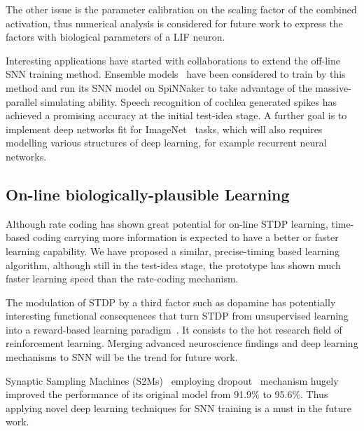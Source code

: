 The other issue is the parameter calibration on the scaling factor of the combined activation, thus numerical analysis is considered for future work to express the factors with biological parameters of a LIF neuron.

Interesting applications have started with collaborations to extend the off-line SNN training method.
Ensemble models~\cite{rokach2010ensemble} have been considered to train by this method and run its SNN model on SpiNNaker to take advantage of the massive-parallel simulating ability.
Speech recognition of cochlea generated spikes has achieved a promising accuracy at the initial test-idea stage.
A further goal is to implement deep networks fit for ImageNet~\cite{deng2009imagenet} tasks, which will also requires modelling various structures of deep learning, for example recurrent neural networks.


\subsection{On-line biologically-plausible Learning}
Although rate coding has shown great potential for on-line STDP learning, time-based coding carrying more information is expected to have a better or faster learning capability.
We have proposed a similar, precise-timing based learning algorithm, although still in the test-idea stage, the prototype has shown much faster learning speed than the rate-coding mechanism.

The modulation of STDP by a third factor such as dopamine has potentially interesting functional consequences that turn STDP from unsupervised learning into a reward-based learning paradigm~\cite{izhikevich2007solving}.
It consists to the hot research field of reinforcement learning.
Merging advanced neuroscience findings and deep learning mechanisms to SNN will be the trend for future work.


Synaptic Sampling Machines (S2Ms)~\cite{neftci2016stochastic} employing dropout~\cite{srivastava2014dropout} mechanism hugely improved the performance of its original model from 91.9\% to 95.6\%.
Thus applying novel deep learning techniques for SNN training is a must in the future work.



